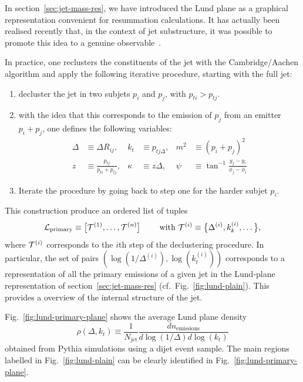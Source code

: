 In section~\ref{sec:jet-mass-res}, we have introduced the Lund plane
as a graphical representation convenient for resummation
calculations. It has actually been realised recently that, in the
context of jet substructure, it was possible to promote this idea to a
genuine observable~\cite{Dreyer:2018nbf}.

In practice, one reclusters the constituents of the jet with the
Cambridge/Aachen algorithm and apply the following iterative
procedure, starting with the full jet:
\begin{enumerate}
\item decluster the jet in two subjets $p_i$ and $p_j$, with $p_{ti}>p_{tj}$.
\item with the idea that this corresponds to the emission of $p_j$
  from an emitter $p_i+p_j$, one defines the following variables:
  \begin{align}
    \Delta &\equiv \Delta R_{ij},& k_t&\equiv p_{tj\Delta},&
    m^2&\equiv (p_i+p_j)^2\\
    z&\equiv\frac{p_{tj}}{p_{ti}+p_{tj}}, &\kappa&\equiv z\Delta,&
    \psi&\equiv\tan^{-1}\frac{y_j-y_i}{\phi_j-\phi_i}
  \end{align}
\item Iterate the procedure by going back to step one for the harder
  subjet $p_i$.
\end{enumerate}
This construction produce an ordered list of tuples
\begin{equation}
{\cal {L}}_{\text{primary}} \equiv \big[{\cal {T}}^{(1)},\dots,{\cal
  {T}}^{(n)}\big]
\qquad\text{ with }{\cal {T}}^{(i)}\equiv\big\{\Delta^{(i)},k_k^{(i)},\dots\big\},
\end{equation}
where ${\cal {T}}^{(i)}$ corresponds to the $i$th step of the
declustering procedure.
%
In particular, the set of pairs
$(\log(1/\Delta^{(i)}),\log(k_t^{(i)}))$ corresponds to a
representation of all the primary emissions of a given jet in the
Lund-plane representation of section~\ref{sec:jet-mass-res}
(cf.~Fig.~\ref{fig:lund-plain}). This provides a overview of the
internal structure of the jet.

Fig.~\ref{fig:lund-primary-plane} shows the average Lund plane density
\begin{equation}
\rho(\Delta,k_t) \equiv \frac{1}{N_\text{jet}}\frac{dn_\text{emissions}}{d\log(1/\Delta)d\log(k_t)}
\end{equation}
obtained from Pythia simulations using a dijet event sample. The main
regions labelled in Fig.~\ref{fig:lund-plain} can be clearly
identified in Fig.~\ref{fig:lund-primary-plane}.

